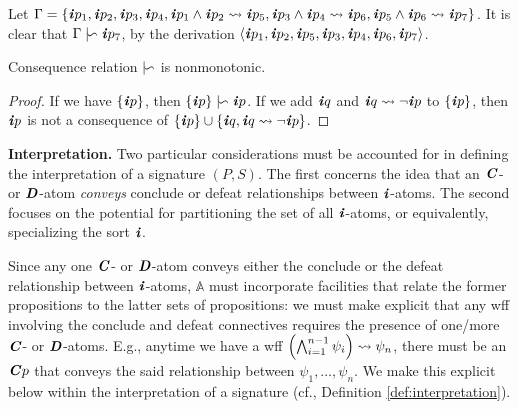 \documentclass[10pt, conference, compsocconf]{IEEEtran}
\begin{document}
\begin{example}
Let $\Gamma = \{ \textbf{\textit{i}}p_{1}, \textbf{\textit{i}}p_{2}, \textbf{\textit{i}}p_{3}, \textbf{\textit{i}}p_{4}, \textbf{\textit{i}}p_{1} \wedge \textbf{\textit{i}}p_{2} \rightsquigarrow \textbf{\textit{i}}p_{5}, \textbf{\textit{i}}p_{3} \wedge \textbf{\textit{i}}p_{4} \rightsquigarrow \textbf{\textit{i}}p_{6}, \textbf{\textit{i}}p_{5} \wedge \textbf{\textit{i}}p_{6} \rightsquigarrow \textbf{\textit{i}}p_{7} \}$. It is clear that $\Gamma \mid\negthinspace\backsim \textbf{\textit{i}}p_{7}$, by the derivation $\langle \textbf{\textit{i}}p_{1}, \textbf{\textit{i}}p_{2}, \textbf{\textit{i}}p_{5}, \textbf{\textit{i}}p_{3}, \textbf{\textit{i}}p_{4}, \textbf{\textit{i}}p_{6}, \textbf{\textit{i}}p_{7} \rangle$.
\end{example}

\begin{proposition}
Consequence relation $\mid\negthinspace\backsim$ is nonmonotonic.
\end{proposition}

\begin{proof}
If we have $\{ \textbf{\textit{i}}p \}$, then $\{ \textbf{\textit{i}}p \} \mid\negthinspace\backsim \textbf{\textit{i}}p$. If we add $\textbf{\textit{i}}q$ and $\textbf{\textit{i}}q \rightsquigarrow \neg\textbf{\textit{i}}{p}$ to $\{ \textbf{\textit{i}}p \}$, then $\textbf{\textit{i}}p$ is not a consequence of $\{ \textbf{\textit{i}}p \} \cup \{ \textbf{\textit{i}}q, \textbf{\textit{i}}q \rightsquigarrow \neg\textbf{\textit{i}}{p} \}$.
\end{proof}


\textbf{Interpretation.} Two particular considerations must be accounted for in defining the interpretation of a signature $(P, S)$. The first concerns the idea that an $\textbf{\textit{C}}$- or $\textbf{\textit{D}}$-atom \textit{conveys} conclude or defeat relationships between $\textbf{\textit{i}}$-atoms. The second focuses on the potential for partitioning the set of all $\textbf{\textit{i}}$-atoms, or equivalently, specializing the sort $\textbf{\textit{i}}$. 

Since any one $\textbf{\textit{C}}$- or $\textbf{\textit{D}}$-atom conveys either the conclude or the defeat relationship between $\textbf{\textit{i}}$-atoms, $\mathbb{A}$ must incorporate facilities that relate the former propositions to the latter sets of propositions: we must make explicit that any wff involving the conclude and defeat connectives requires the presence of one/more $\textbf{\textit{C}}$- or $\textbf{\textit{D}}$-atoms. E.g., anytime we have a wff $\left(\bigwedge_{i=1}^{n-1}\psi_{i} \right) \rightsquigarrow \psi_{n}$, there must be an $\textbf{\textit{C}}p$ that conveys the said relationship between $\psi_{1},\ldots,\psi_{n}$. We make this explicit below within the interpretation of a signature (cf., Definition \ref{def:interpretation}). 
\end{document}

